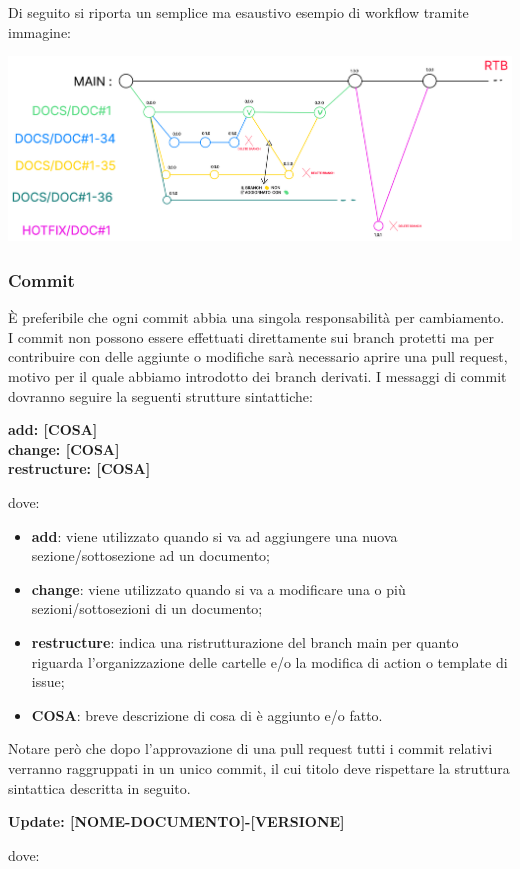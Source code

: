 Di seguito si riporta un semplice ma esaustivo esempio di workflow tramite
immagine:
\begin{center}
    \includegraphics[scale = 0.33]{template/images/workflow.png}
\end{center}

\subsubsection{Commit}\label{inf:comm}
È preferibile che ogni commit abbia una singola responsabilità per cambiamento.
I commit non possono essere effettuati direttamente sui branch protetti ma per contribuire con delle aggiunte o
modifiche sarà necessario aprire una pull request, motivo per il quale abbiamo introdotto dei branch derivati.
I messaggi di commit dovranno seguire la seguenti strutture sintattiche:
\begin{center}
    \textbf{add: [COSA]\\
    change: [COSA]\\
    restructure: [COSA]}
\end{center}
dove:
\begin{itemize}
    \item \textbf{add}: viene utilizzato quando si va ad aggiungere una nuova sezione/sottosezione ad un documento;
    \item \textbf{change}: viene utilizzato quando si va a modificare una o più sezioni/sottosezioni di un documento;
    \item \textbf{restructure}: indica una ristrutturazione del branch main per quanto riguarda l'organizzazione delle cartelle e/o la modifica di action o template di issue;
    \item \textbf{COSA}: breve descrizione di cosa di è aggiunto e/o fatto.
\end{itemize}

Notare però che dopo l'approvazione di una pull request tutti i commit relativi
verranno raggruppati in un unico commit, il cui titolo deve rispettare la
struttura sintattica descritta in seguito.
\begin{center}
    \textbf{Update: [NOME-DOCUMENTO]-[VERSIONE]}
\end{center}
dove:


